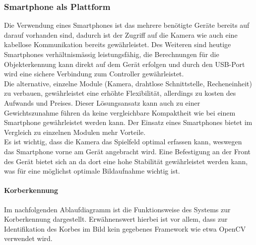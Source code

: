 \subsubsection{Smartphone als Plattform}
	Die Verwendung eines Smartphones ist das mehrere benötigte Geräte bereits auf darauf vorhanden sind, dadurch ist der Zugriff auf die Kamera wie auch eine kabellose Kommunikation bereits gewährleistet. Des Weiteren sind heutige Smartphones verhältnismässig leistungsfähig, die Berechnungen für die Objekterkennung kann direkt auf dem Gerät erfolgen und durch den USB-Port wird eine sichere Verbindung zum Controller gewährleistet.\\
	Die alternative, einzelne Module (Kamera, drahtlose Schnittstelle, Recheneinheit) zu verbauen, gewährleistet eine erhöhte Flexibilität, allerdings zu kosten des Aufwands und Preises. Dieser Lösungsansatz kann auch zu einer Gewichtszunahme führen da keine vergleichbare Kompaktheit wie bei einem Smartphone gewährleistet werden kann. Der Einsatz eines Smartphones bietet im Vergleich zu einzelnen Modulen mehr Vorteile.\\
	 Es ist wichtig, dass die Kamera das Spielfeld optimal erfassen kann, weswegen das Smartphone vorne am Gerät angebracht wird. Eine Befestigung an der Front des Gerät bietet sich an da dort eine hohe Stabilität gewährleistet werden kann, was für eine möglichst optimale Bildaufnahme wichtig ist.\\
	
	
	
	\paragraph{Korberkennung}
	Im nachfolgenden Ablaufdiagramm ist die Funktionsweise des Systems zur Korberkennung dargestellt. Erwähnenswert hierbei ist vor allem, dass zur Identifikation des Korbes im Bild kein gegebenes Framework wie etwa OpenCV verwendet wird. \\
	
